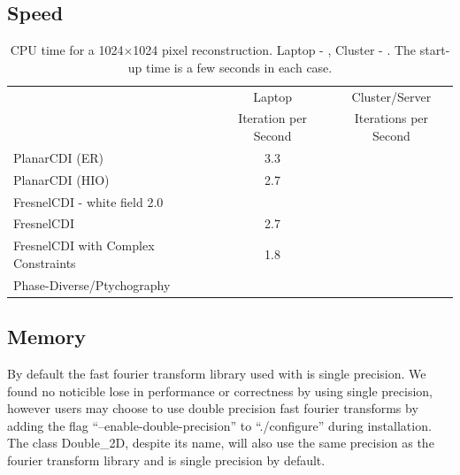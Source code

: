 \documentclass[]{cxs-software}
\begin{document}
\subsection{Speed}

\begin{table}
\begin{tabular}{lcc}
\toprule
   & Laptop & Cluster/Server \\
   & Iteration per Second & Iterations per Second \\
\midrule
PlanarCDI (ER) & 3.3  &  \\
PlanarCDI (HIO) & 2.7 & \\
FresnelCDI - white field 2.0 &   & \\
FresnelCDI & 2.7 & \\
FresnelCDI with Complex Constraints & 1.8 & \\
Phase-Diverse/Ptychography & & \\
\bottomrule
\end{tabular}

\caption{\label{table:speed} CPU time for a 1024$\times$1024 pixel reconstruction. Laptop - , Cluster - . The start-up time is a few seconds in each case. 
}

\end{table}



\subsection{Memory}

By default the fast fourier transform library used with \name is
single precision. We found no noticible lose in performance or
correctness by using single precision, however users may choose to use
double precision fast fourier transforms by adding the flag
``--enable-double-precision'' to ``./configure'' during installation.
The class Double\_2D, despite its name, will also use the same
precision as the fourier transform library and is single precision by
default.
\end{document}
